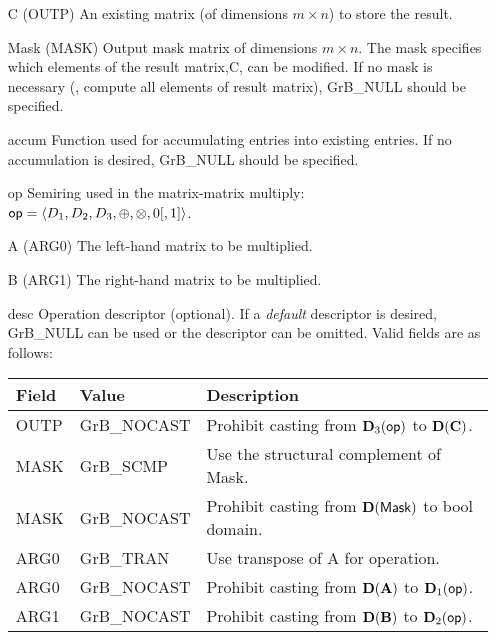 \begin{itemize}[leftmargin=1.1in]
    \item[{\sf C}]    ({\sf OUTP}) An existing matrix (of dimensions $m \times n$) to store the result. 

    \item[{\sf Mask}] ({\sf MASK}) Output mask matrix of dimensions $m \times n$. 
    The mask specifies which elements of the result matrix,{\sf C}, can be modified. 
    If no mask is necessary (\ie, compute all elements of result
    matrix), {\sf GrB\_NULL} should be specified.

    \item[{\sf accum}]  Function used for accumulating entries into existing
     entries. If no accumulation is desired,
    {\sf GrB\_NULL} should be specified.

    \item[{\sf op}]   Semiring used in the matrix-matrix multiply: ${\sf op}=\langle D_1,D_2,D_3,\oplus,\otimes,0 [,1] \rangle$.
    \item[{\sf A}]    ({\sf ARG0}) The left-hand matrix to be multiplied.  
    \item[{\sf B}]    ({\sf ARG1}) The right-hand matrix to be multiplied. 

    \item[{\sf desc}]  Operation descriptor (optional). If a
    \emph{default} descriptor is desired, {\sf GrB\_NULL} can be
    used or the descriptor can be omitted. Valid fields are as follows: \\
    \begin{tabular}{lll}
    Field  & Value & Description \\
    \hline
    {\sf OUTP} & {\sf GrB\_NOCAST} & Prohibit casting from $\bold{D}_3({\sf op})$ to $\bold{D}({\bf C})$.\\
    {\sf MASK} & {\sf GrB\_SCMP} & Use the structural complement of {\sf Mask}. \\
    {\sf MASK} & {\sf GrB\_NOCAST} & Prohibit casting from $\bold{D}({\sf Mask})$ to {\sf bool} domain. \\
    {\sf ARG0} & {\sf GrB\_TRAN} & Use transpose of {\sf A} for operation. \\
    {\sf ARG0} & {\sf GrB\_NOCAST} & Prohibit casting from $\bold{D}({\bf A})$ to $\bold{D}_1({\sf op})$. \\
    {\sf ARG1} & {\sf GrB\_NOCAST} & Prohibit casting from $\bold{D}({\bf B})$ to $\bold{D}_2({\sf op})$. \\
    \end{tabular}
\end{itemize}

